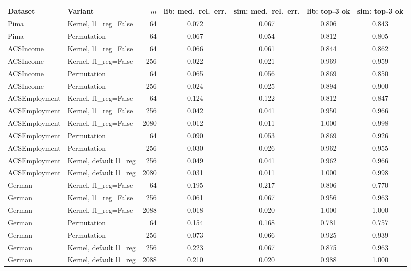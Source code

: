 \begin{tabular}{llrcccc}
\toprule
Dataset & Variant & $m$ & lib: med.\ rel.\ err. & sim: med.\ rel.\ err. & lib: top-3 ok & sim: top-3 ok\\
\midrule
Pima & Kernel, l1\_reg=False & 64 & 0.072 & 0.067 & 0.806 & 0.843\\
Pima & Permutation & 64 & 0.067 & 0.054 & 0.812 & 0.805\\
\midrule
ACSIncome & Kernel, l1\_reg=False & 64 & 0.066 & 0.061 & 0.844 & 0.862\\
ACSIncome & Kernel, l1\_reg=False & 256 & 0.022 & 0.021 & 0.969 & 0.959\\
ACSIncome & Permutation & 64 & 0.065 & 0.056 & 0.869 & 0.850\\
ACSIncome & Permutation & 256 & 0.024 & 0.025 & 0.894 & 0.900\\
\midrule
ACSEmployment & Kernel, l1\_reg=False & 64 & 0.124 & 0.122 & 0.812 & 0.847\\
ACSEmployment & Kernel, l1\_reg=False & 256 & 0.042 & 0.041 & 0.950 & 0.966\\
ACSEmployment & Kernel, l1\_reg=False & 2080 & 0.012 & 0.011 & 1.000 & 0.998\\
ACSEmployment & Permutation & 64 & 0.090 & 0.053 & 0.869 & 0.926\\
ACSEmployment & Permutation & 256 & 0.030 & 0.026 & 0.962 & 0.955\\
ACSEmployment & Kernel, default l1\_reg & 256 & 0.049 & 0.041 & 0.962 & 0.966\\
ACSEmployment & Kernel, default l1\_reg & 2080 & 0.031 & 0.011 & 1.000 & 0.998\\
\midrule
German & Kernel, l1\_reg=False & 64 & 0.195 & 0.217 & 0.806 & 0.770\\
German & Kernel, l1\_reg=False & 256 & 0.061 & 0.067 & 0.956 & 0.963\\
German & Kernel, l1\_reg=False & 2088 & 0.018 & 0.020 & 1.000 & 1.000\\
German & Permutation & 64 & 0.154 & 0.168 & 0.781 & 0.757\\
German & Permutation & 256 & 0.073 & 0.066 & 0.925 & 0.939\\
German & Kernel, default l1\_reg & 256 & 0.223 & 0.067 & 0.875 & 0.963\\
German & Kernel, default l1\_reg & 2088 & 0.210 & 0.020 & 0.988 & 1.000\\
\bottomrule
\end{tabular}